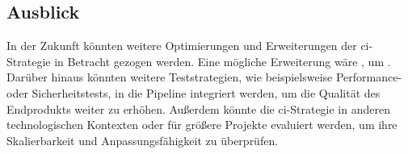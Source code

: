 \subsection{Ausblick} \label{subsec:06-prospect-2}


In der Zukunft könnten weitere Optimierungen und Erweiterungen der \acrshort{ci}-Strategie in Betracht gezogen werden.
Eine mögliche Erweiterung wäre , um .
Darüber hinaus könnten weitere Teststrategien, wie beispielsweise Performance- oder Sicherheitstests, in die
Pipeline integriert werden, um die Qualität des Endprodukts weiter zu erhöhen.
Außerdem könnte die \acrshort{ci}-Strategie in anderen technologischen Kontexten oder für größere Projekte evaluiert
werden, um ihre Skalierbarkeit und Anpassungsfähigkeit zu überprüfen.


\clearpage
